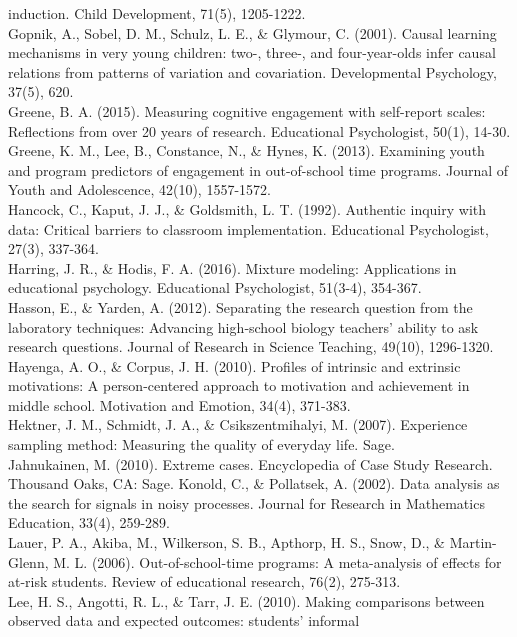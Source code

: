 \documentclass[]{msu-thesis}
\theoremstyle{definition}
\theoremstyle{definition}
\theoremstyle{definition}
\theoremstyle{remark}
\begin{document}
induction. Child Development, 71(5), 1205-1222.\\
Gopnik, A., Sobel, D. M., Schulz, L. E., \& Glymour, C. (2001). Causal
learning mechanisms in very young children: two-, three-, and
four-year-olds infer causal relations from patterns of variation and
covariation. Developmental Psychology, 37(5), 620.\\
Greene, B. A. (2015). Measuring cognitive engagement with self-report
scales: Reflections from over 20 years of research. Educational
Psychologist, 50(1), 14-30.\\
Greene, K. M., Lee, B., Constance, N., \& Hynes, K. (2013). Examining
youth and program predictors of engagement in out-of-school time
programs. Journal of Youth and Adolescence, 42(10), 1557-1572.\\
Hancock, C., Kaput, J. J., \& Goldsmith, L. T. (1992). Authentic inquiry
with data: Critical barriers to classroom implementation. Educational
Psychologist, 27(3), 337-364.\\
Harring, J. R., \& Hodis, F. A. (2016). Mixture modeling: Applications
in educational psychology. Educational Psychologist, 51(3-4), 354-367.\\
Hasson, E., \& Yarden, A. (2012). Separating the research question from
the laboratory techniques: Advancing high‐school biology teachers'
ability to ask research questions. Journal of Research in Science
Teaching, 49(10), 1296-1320.\\
Hayenga, A. O., \& Corpus, J. H. (2010). Profiles of intrinsic and
extrinsic motivations: A person-centered approach to motivation and
achievement in middle school. Motivation and Emotion, 34(4), 371-383.\\
Hektner, J. M., Schmidt, J. A., \& Csikszentmihalyi, M. (2007).
Experience sampling method: Measuring the quality of everyday life.
Sage.\\
Jahnukainen, M. (2010). Extreme cases. Encyclopedia of Case Study
Research. Thousand Oaks, CA: Sage. Konold, C., \& Pollatsek, A. (2002).
Data analysis as the search for signals in noisy processes. Journal for
Research in Mathematics Education, 33(4), 259-289.\\
Lauer, P. A., Akiba, M., Wilkerson, S. B., Apthorp, H. S., Snow, D., \&
Martin-Glenn, M. L. (2006). Out-of-school-time programs: A meta-analysis
of effects for at-risk students. Review of educational research, 76(2),
275-313.\\
Lee, H. S., Angotti, R. L., \& Tarr, J. E. (2010). Making comparisons
between observed data and expected outcomes: students' informal
\end{document}
